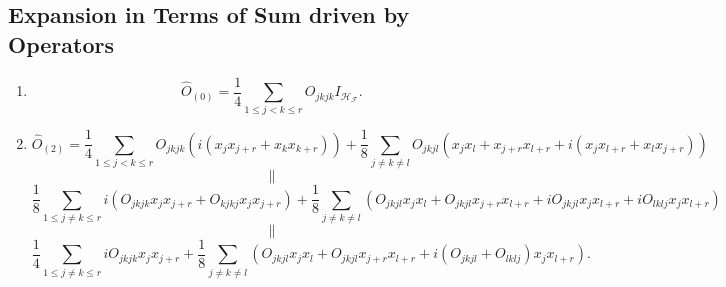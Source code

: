 \documentclass[aps,preprint]{revtex4}%
\begin{document}
\subsection*{ Expansion in Terms of Sum driven by Operators}

\begin{enumerate}
\item
\begin{equation}
\hat{O}_{\left(  0\right)  }=\frac{1}{4}\sum_{1\leq j<k\leq r}O_{jkjk}%
I_{\mathcal{H}_{\mathcal{F}}}.
\end{equation}


\item
\begin{equation}
\hat{O}_{\left(  2\right)  }=\frac{1}{4}\sum_{1\leq j<k\leq r}O_{jkjk}\left(
\overset{}{i\left(  x_{j}x_{j+r}+x_{k}x_{k+r}\right)  }\right)  +\frac{1}%
{8}\sum_{j\neq k\neq l}O_{jkjl}\left(  \overset{}{x_{j}x_{l}+x_{j+r}%
x_{l+r}+i\left(  x_{j}x_{l+r}+x_{l}x_{j+r}\right)  }\right)
\end{equation}%
\begin{equation}
\parallel
\end{equation}%
\begin{equation}
\frac{1}{8}\sum_{1\leq j\neq k\leq r}\overset{}{i\left(  O_{jkjk}x_{j}%
x_{j+r}+O_{kjkj}x_{j}x_{j+r}\right)  }+\frac{1}{8}\sum_{j\neq k\neq l}\left(
O_{jkjl}x_{j}x_{l}+O_{jkjl}x_{j+r}x_{l+r}+iO_{jkjl}x_{j}x_{l+r}+iO_{lklj}%
x_{j}x_{l+r}\right)
\end{equation}%
\begin{equation}
\parallel
\end{equation}%
\begin{equation}
\frac{1}{4}\sum_{1\leq j\neq k\leq r}\overset{}{iO_{jkjk}x_{j}x_{j+r}}%
+\frac{1}{8}\sum_{j\neq k\neq l}\left(  O_{jkjl}x_{j}x_{l}+O_{jkjl}%
x_{j+r}x_{l+r}+i\left(  O_{jkjl}+O_{lklj}\right)  x_{j}x_{l+r}\right)  .
\end{equation}

\end{enumerate}

%
\end{document}
